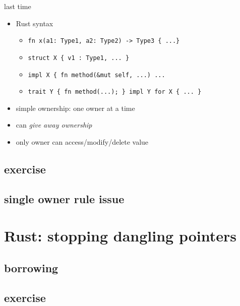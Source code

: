 \date{}
\title{}
\date{}
\usepackage[outputdir=latex.out]{minted}

\begin{frame}
    \titlepage
\end{frame}



\begin{frame}[fragile]{last time}
    \begin{itemize}
    \item Rust syntax
        \begin{itemize}
        \item \verb|fn x(a1: Type1, a2: Type2) -> Type3 { ...}|
        \item \verb|struct X { v1 : Type1, ... }|
        \item \verb|impl X { fn method(&mut self, ...) ...|
        \item \verb|trait Y { fn method(...); } impl Y for X { ... }|
        \end{itemize}
    \item simple ownership: one owner at a time
    \item can \textit{give away ownership}
    \item only owner can access/modify/delete value
    \end{itemize}
\end{frame}

\subsection{exercise}


\subsection{single owner rule issue}


\section{Rust: stopping dangling pointers}


\subsection{borrowing}


\subsection{exercise}



